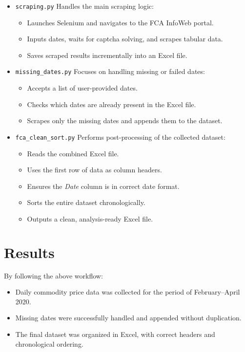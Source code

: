 \documentclass[12pt]{article}
\begin{document}
\begin{itemize}
    \item \texttt{scraping.py}  
    Handles the main scraping logic:
    \begin{itemize}
        \item Launches Selenium and navigates to the FCA InfoWeb portal.
        \item Inputs dates, waits for captcha solving, and scrapes tabular data.
        \item Saves scraped results incrementally into an Excel file.
    \end{itemize}

    \item \texttt{missing\_dates.py}  
    Focuses on handling missing or failed dates:
    \begin{itemize}
        \item Accepts a list of user-provided dates.
        \item Checks which dates are already present in the Excel file.
        \item Scrapes only the missing dates and appends them to the dataset.
    \end{itemize}

    \item \texttt{fca\_clean\_sort.py}  
    Performs post-processing of the collected dataset:
    \begin{itemize}
        \item Reads the combined Excel file.
        \item Uses the first row of data as column headers.
        \item Ensures the \emph{Date} column is in correct date format.
        \item Sorts the entire dataset chronologically.
        \item Outputs a clean, analysis-ready Excel file.
    \end{itemize}
\end{itemize}

\section*{Results}
By following the above workflow:
\begin{itemize}
    \item Daily commodity price data was collected for the period of February--April 2020.
    \item Missing dates were successfully handled and appended without duplication.
    \item The final dataset was organized in Excel, with correct headers and chronological ordering.
\end{itemize}
\end{document}
